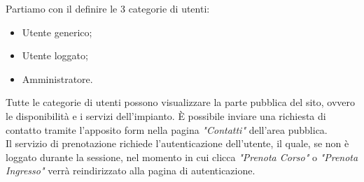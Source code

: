 Partiamo con il definire le 3 categorie di utenti:
\begin{itemize}
    \item Utente generico;
    \item Utente loggato;
    \item Amministratore.
\end{itemize}

Tutte le categorie di utenti possono visualizzare la parte pubblica del sito, ovvero le disponibilità e i servizi dell'impianto. È possibile inviare una richiesta di contatto tramite l'apposito form nella pagina \textit{"Contatti"} dell'area pubblica.\\

Il servizio di prenotazione richiede l'autenticazione dell'utente, il quale, se non è loggato durante la sessione, nel momento in cui clicca \textit{"Prenota Corso"} o \textit{"Prenota Ingresso"} verrà reindirizzato alla pagina
di autenticazione.